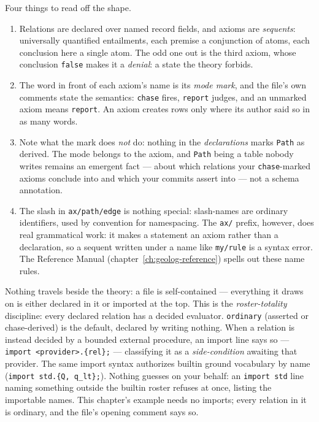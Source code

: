Four things to read off the shape.
\begin{enumerate}
\item Relations are declared over named record fields, and axioms
are \emph{sequents}: universally quantified entailments, each
premise a conjunction of atoms, each conclusion here a single atom.
The odd one out is the third axiom, whose conclusion \texttt{false}
makes it a \emph{denial}: a state the theory forbids.
\item The word in front of each axiom's name is its \emph{mode
mark}, and the file's own comments state the semantics:
\texttt{chase} fires, \texttt{report} judges, and an unmarked axiom
means \texttt{report}. An axiom creates rows only where its author
said so in as many words.
\item Note what the mark does \emph{not} do: nothing in the
\emph{declarations} marks \texttt{Path} as derived. The mode belongs
to the axiom, and \texttt{Path} being a table nobody writes remains
an emergent fact --- about which relations your \texttt{chase}-marked
axioms conclude into and which your commits assert into --- not a
schema annotation.
\item The slash in \texttt{ax/path/edge} is nothing special:
slash-names are ordinary identifiers, used by convention for
namespacing. The \texttt{ax/} prefix, however, does real grammatical
work: it makes a statement an axiom rather than a declaration, so a
sequent written under a name like \texttt{my/rule} is a syntax
error. The Reference Manual (chapter~\ref{ch:geolog-reference})
spells out these name rules.
\end{enumerate}

Nothing travels beside the theory: a  file is
self-contained --- everything it draws on is either declared in it
or imported at the top. This is the \emph{roster-totality}
discipline: every declared relation has a decided evaluator.
\texttt{ordinary} (asserted or chase-derived) is the default,
declared by writing nothing. When a relation is instead decided by a
bounded external procedure, an import line says so ---
\texttt{import <provider>.\{rel\};} --- classifying it as a
\emph{side-condition} awaiting that provider. The same import syntax
authorizes builtin ground vocabulary by name
(\texttt{import std.\{Q, q\_lt\};}). Nothing guesses on
your behalf: an \texttt{import std} line naming something outside
the builtin roster refuses at once, listing the importable names.
This chapter's example needs no imports; every relation in it is
ordinary, and the file's opening comment says so.

